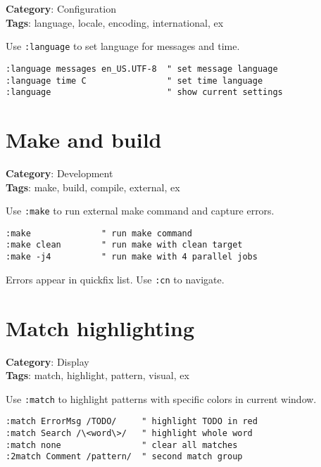 {{{{{{\textbf{Category}: Configuration\\ \textbf{Tags}: language, locale, encoding, international, ex
\vspace{0.5cm}

Use {\footnotesize \Verb§:language§} to set language for messages and time.

\begin{Exa*}{}
\begin{Verbatim}[fontsize=\footnotesize, breaklines, breakanywhere]
:language messages en_US.UTF-8  " set message language
:language time C                " set time language
:language                       " show current settings
\end{Verbatim}
\end{Exa*}

\section{Make and build}

\textbf{Category}: Development\\ \textbf{Tags}: make, build, compile, external, ex
\vspace{0.5cm}

Use {\footnotesize \Verb§:make§} to run external make command and capture errors.

\begin{Exa*}{}
\begin{Verbatim}[fontsize=\footnotesize, breaklines, breakanywhere]
:make              " run make command
:make clean        " run make with clean target
:make -j4          " run make with 4 parallel jobs
\end{Verbatim}
\end{Exa*}

Errors appear in quickfix list. Use {\footnotesize \Verb§:cn§} to navigate.

\section{Match highlighting}

\textbf{Category}: Display\\ \textbf{Tags}: match, highlight, pattern, visual, ex
\vspace{0.5cm}

Use {\footnotesize \Verb§:match§} to highlight patterns with specific colors in current window.

\begin{Exa*}{}
\begin{Verbatim}[fontsize=\footnotesize, breaklines, breakanywhere]
:match ErrorMsg /TODO/     " highlight TODO in red
:match Search /\<word\>/   " highlight whole word
:match none                " clear all matches
:2match Comment /pattern/  " second match group
\end{Verbatim}
\end{Exa*}

}}}}}}
